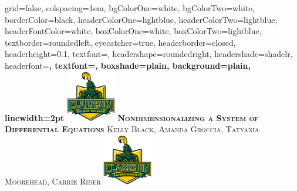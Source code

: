 \documentclass[landscape,final,a0paper,fontscale=0.285]{baposter}
\begin{document}


\begin{poster}%
  {
  grid=false,
  colspacing=1em,
  bgColorOne=white,
  bgColorTwo=white,
  borderColor=black,
  headerColorOne=lightblue,
  headerColorTwo=lightblue,
  headerFontColor=white,
  boxColorOne=white,
  boxColorTwo=lightblue,
  textborder=roundedleft,
  eyecatcher=true,
  headerborder=closed,
  headerheight=0.1\textheight,
  textfont=\sc, %
  headershape=roundedright,
  headershade=shadelr,
  headerfont=\Large\bf\textsc, %
  textfont={\setlength{\parindent}{1.5em}},
  boxshade=plain,
  background=plain,
  linewidth=2pt
  }
  {\includegraphics[height=6em]{img/Clarkson}} 
  {\bf\textsc{Nondimensionalizing a System of Differential Equations}\vspace{0.5em}}
  {\textsc{Kelly Black, Amanda Groccia, Tatyania Moorehead, Carrie Rider}}
  {%
\includegraphics[height=6.0em]{img/Clarkson}
  }




\end{poster}
\end{document}
